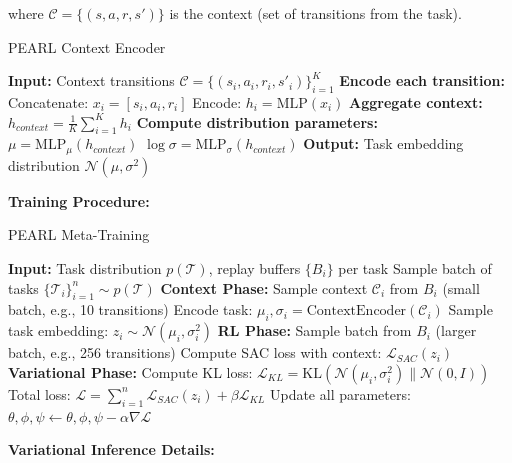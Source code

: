 \documentclass[12pt]{article}
\newcommand{\ieee}[1]{\textcolor{IEEEBlue}{\textbf{#1}}}
\begin{document}
{{			where $\mathcal{C} = \{(s, a, r, s')\}$ is the context (set of transitions from the task).
			
			\begin{algorithm}[H]
			\caption{PEARL Context Encoder}
			\begin{algorithmic}[1]
			\STATE \textbf{Input:} Context transitions $\mathcal{C} = \{(s_i, a_i, r_i, s'_i)\}_{i=1}^K$
			\STATE \textbf{Encode each transition:}
			\STATE Concatenate: $x_i = [s_i, a_i, r_i]$
			\STATE Encode: $h_i = \text{MLP}(x_i)$
			\ENDFOR
			\STATE \textbf{Aggregate context:}
			\STATE $h_{context} = \frac{1}{K} \sum_{i=1}^K h_i$ 
			\STATE \textbf{Compute distribution parameters:}
			\STATE $\mu = \text{MLP}_\mu(h_{context})$
			\STATE $\log\sigma = \text{MLP}_\sigma(h_{context})$
			\STATE \textbf{Output:} Task embedding distribution $\mathcal{N}(\mu, \sigma^2)$
			\end{algorithmic}
			\end{algorithm}
			
			\ieee{Training Procedure:}
			
			\begin{algorithm}[H]
			\caption{PEARL Meta-Training}
			\begin{algorithmic}[1]
			\STATE \textbf{Input:} Task distribution $p(\mathcal{T})$, replay buffers $\{B_i\}$ per task
			\STATE Sample batch of tasks $\{\mathcal{T}_i\}_{i=1}^n \sim p(\mathcal{T})$
			\STATE \textbf{Context Phase:}
			\STATE Sample context $\mathcal{C}_i$ from $B_i$ (small batch, e.g., 10 transitions)
			\STATE Encode task: $\mu_i, \sigma_i = \text{ContextEncoder}(\mathcal{C}_i)$
			\STATE Sample task embedding: $z_i \sim \mathcal{N}(\mu_i, \sigma_i^2)$
			\STATE \textbf{RL Phase:}
			\STATE Sample batch from $B_i$ (larger batch, e.g., 256 transitions)
			\STATE Compute SAC loss with context: $\mathcal{L}_{SAC}(z_i)$
			\STATE \textbf{Variational Phase:}
			\STATE Compute KL loss: $\mathcal{L}_{KL} = \text{KL}(\mathcal{N}(\mu_i, \sigma_i^2) \| \mathcal{N}(0, I))$
			\ENDFOR
			\STATE Total loss: $\mathcal{L} = \sum_{i=1}^n \mathcal{L}_{SAC}(z_i) + \beta \mathcal{L}_{KL}$
			\STATE Update all parameters: $\theta, \phi, \psi \leftarrow \theta, \phi, \psi - \alpha \nabla \mathcal{L}$
			\ENDWHILE
			\end{algorithmic}
			\end{algorithm}
			
			\ieee{Variational Inference Details:}
			
}}
\end{document}
